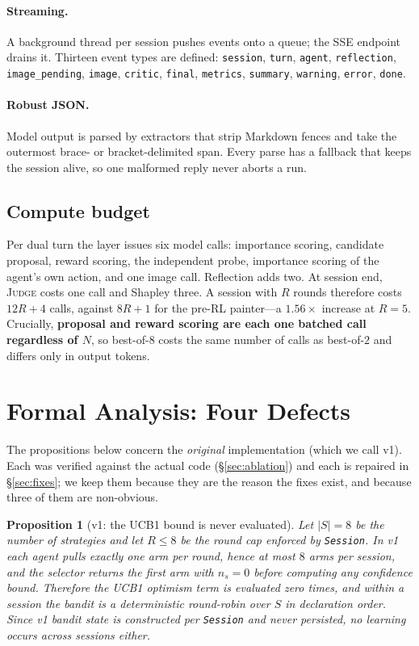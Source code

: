 \documentclass[11pt]{article}
\newcommand{\code}[1]{\texttt{\small #1}}
\newcommand{\JUDGE}{\textsc{Judge}}
\theoremstyle{plain}
\newtheorem{proposition}{Proposition}
\theoremstyle{definition}
\begin{document}
\paragraph{Streaming.}
A background thread per session pushes events onto a queue; the SSE endpoint
drains it. Thirteen event types are defined: \code{session}, \code{turn},
\code{agent}, \code{reflection}, \code{image\_pending}, \code{image},
\code{critic}, \code{final}, \code{metrics}, \code{summary}, \code{warning},
\code{error}, \code{done}.

\paragraph{Robust JSON.}
Model output is parsed by extractors that strip Markdown fences and take the
outermost brace- or bracket-delimited span. Every parse has a fallback that keeps
the session alive, so one malformed reply never aborts a run.

\subsection{Compute budget}
\label{sec:compute}
Per dual turn the layer issues six model calls: importance scoring, candidate
proposal, reward scoring, the independent probe, importance scoring of the
agent's own action, and one image call. Reflection adds two. At session end,
\JUDGE{} costs one call and Shapley three. A session with $R$ rounds therefore
costs $12R + 4$ calls, against $8R + 1$ for the pre-RL painter---a $1.56\times$
increase at $R{=}5$. Crucially, \textbf{proposal and reward scoring are each one
batched call regardless of $N$}, so best-of-$8$ costs the same number of calls as
best-of-$2$ and differs only in output tokens.

\section{Formal Analysis: Four Defects}
\label{sec:analysis}
The propositions below concern the \emph{original} implementation (which we call
v1). Each was verified against the actual code (\S\ref{sec:ablation}) and each is
repaired in \S\ref{sec:fixes}; we keep them because they are the reason the fixes
exist, and because three of them are non-obvious.

\begin{proposition}[v1: the UCB1 bound is never evaluated]
\label{prop:bandit}
Let $|S| = 8$ be the number of strategies and let $R \le 8$ be the round cap
enforced by \code{Session}. In v1 each agent pulls exactly one arm per round,
hence at most $8$ arms per session, and the selector returns the first arm with
$n_s = 0$ before computing any confidence bound. Therefore the UCB1 optimism term
is evaluated zero times, and within a session the bandit is a deterministic
round-robin over $S$ in declaration order. Since v1 bandit state is constructed
per \code{Session} and never persisted, no learning occurs across sessions
either.
\end{proposition}
\end{document}

